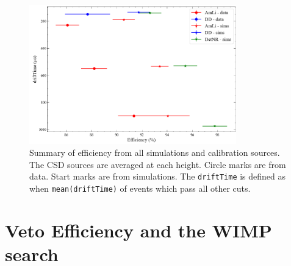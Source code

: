 \begin{figure}
	\centering
	\includegraphics[width=0.8\textwidth]{figures/VetoEfficiency/efficiency_summary.png}
	\caption{Summary of efficiency from all simulations and calibration sources.
		The CSD sources are averaged at each height.
		Circle marks are from data.
		Start marks are from simulations.
		The \lstinline{driftTime} is defined as when \lstinline{mean(driftTime)} of events which pass all other cuts.
	}
	\label{fig:efficiency_summary}
\end{figure}
\section{Veto Efficiency and the WIMP search}
